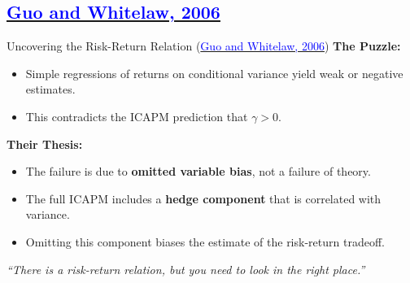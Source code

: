\documentclass{beamer}
\begin{document}
\subsection{\href{https://doi.org/10.1111/j.1540-6261.2006.00877.x}{\textcolor{blue}{Guo and Whitelaw, 2006}}}

\begin{frame}{Uncovering the Risk-Return Relation (\href{https://doi.org/10.1111/j.1540-6261.2006.00877.x}{\textcolor{blue}{Guo and Whitelaw, 2006}})}
    \textbf{The Puzzle:}
    \begin{itemize}
        \item Simple regressions of returns on conditional variance yield weak or negative estimates.
        \item This contradicts the ICAPM prediction that $\gamma > 0$.
    \end{itemize}
    
    \vspace{0.3cm}
    \textbf{Their Thesis:}
    \begin{itemize}
        \item The failure is due to \textbf{omitted variable bias}, not a failure of theory.
        \item The full ICAPM includes a \textbf{hedge component} that is correlated with variance.
        \item Omitting this component biases the estimate of the risk-return tradeoff.
    \end{itemize}
    
    \vspace{0.3cm}
    \centering
    \textit{``There is a risk-return relation, but you need to look in the right place.''}
\end{frame}
\end{document}
